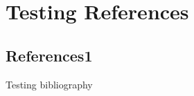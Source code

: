 \documentclass[12pt,a4paper,compress]{beamer}
\begin{document}
\section{Testing References}
\subsection{References1}
\begin{frame}
	Testing bibliography \cite{article2014test}
\end{frame}

\section*{}
\begin{frame}[allowframebreaks, t]
	
\end{frame}
\end{document}
